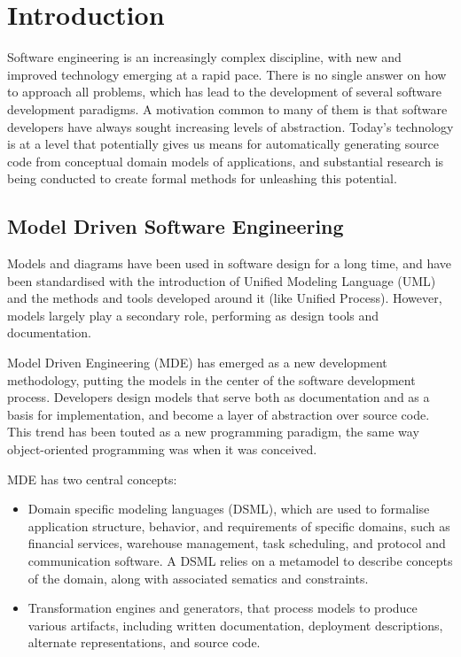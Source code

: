 \chapter{Introduction}
\label{chap:introduction}
 
Software engineering is an increasingly complex discipline, with
new and improved technology emerging at a rapid pace. There is no single answer
on how to approach all problems, which has lead to the development of several
software development paradigms. A motivation common to many of them is that
software developers have always sought increasing levels of abstraction.
Today's technology is at a level that potentially gives us means for
automatically generating source code from conceptual domain models of
applications, and substantial research is being conducted to create formal
methods for unleashing this potential.


\section{Model Driven Software Engineering}

Models and diagrams have been used in software design for a long time, and have
been standardised with the introduction of Unified Modeling Language (UML)
and the methods and tools developed around it (like Unified Process).
However, models largely play a secondary role, performing as design tools and
documentation.

Model Driven Engineering (MDE) has emerged as a new development methodology,
putting the models in the center of the software development process. Developers
design models that serve both as documentation and as a basis for
implementation, and become a layer of abstraction over source code. This
trend has been touted as a new programming paradigm, the same way
object-oriented programming was when it was conceived.

MDE has two central concepts:
\begin{itemize}
	\item Domain specific modeling languages (DSML), which are used to formalise application structure, behavior,
and requirements of specific domains, such as financial services, warehouse
management, task scheduling, and protocol and communication software. A DSML
relies on a metamodel to describe concepts of the domain, along with associated
sematics and constraints.
	\item  Transformation engines and generators, that process models to produce various
artifacts, including written documentation, deployment descriptions,
alternate representations, and source code.
\end{itemize}

